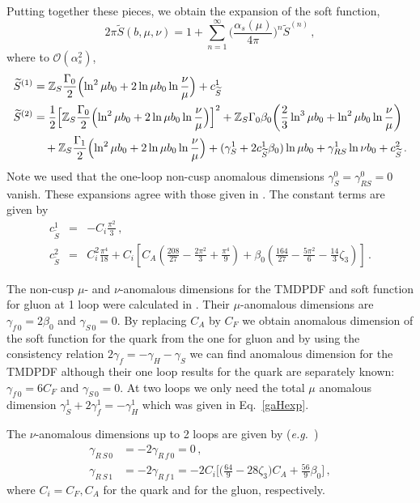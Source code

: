 \documentclass[a4,letterpaper,11pt]{article}
\newcommand{\nn}{\nonumber}
\newcommand{\be}{\begin{equation}}
\newcommand{\ee}{\end{equation}}
\newcommand{\bea}{\begin{eqnarray}}
\newcommand{\eea}{\end{eqnarray}}
\newcommand{\as}{\alpha_s}
\newcommand{\eg}{\emph{e.g.}~}
\newcommand{\cO}{\mathcal{O}}
\newcommand{\zed}{\mathbb{Z}}
\newcommand{\wt}{\widetilde}
\newcommand{\eq}[1]{Eq.~\eqref{#1}}
\begin{document}
Putting together these pieces, we obtain the expansion of the soft function,
\be
\label{Sfixedorder}
2\pi \wt S(b,\mu,\nu) = 1 + \sum_{n=1}^\infty\biggl(\frac{\as(\mu)}{4\pi}\biggr)^n \wt S^{(n)}\,,
\ee
where to $\cO(\as^2)$,
\begin{subequations}
\label{Sn}
\begin{align}
\wt S^{(1)} &= \zed_S \frac{\Gamma_0}{2} \Bigl(\ln^2 \mu b_0 + 2 \ln \mu b_0 \ln \frac{\nu}{\mu}\Bigr)  + c_{\wt S}^1 \\
\wt S^{(2)} &= \frac{1}{2}\Bigl[\zed_S \frac{\Gamma_0}{2} \Bigl(\ln^2 \mu b_0 + 2 \ln \mu b_0 \ln \frac{\nu}{\mu}\Bigr)  \Bigr]^2 + \zed_S \Gamma_0\beta_0 \biggl( \frac{2}{3}\ln^3 \mu b_0 + \ln^2 \mu b_0 \ln \frac{\nu}{\mu}\biggr)  \\
&\quad + \zed_S \frac{\Gamma_1}{2}  \Bigl(\ln^2 \mu b_0 + 2 \ln \mu b_0 \ln \frac{\nu}{\mu}\Bigr)   + (\gamma_S^1 + 2c_{\wt S}^1\beta_0) \ln\mu b_0 + \gamma_{RS}^1 \ln\nu b_0 + c_{\wt S}^2 \,. \nn
\end{align}
\end{subequations}
Note we used that the one-loop non-cusp anomalous dimensions $\gamma_S^0 = \gamma_{RS}^0 = 0$ vanish. These expansions agree with those given in \cite{Luebbert:2016itl}.
The constant terms are given by
\bea
 c_{\wt S}^1 &=& -C_i \frac{\pi^2}{3}
 \,, \nn \\
 c_{\wt S}^2 &=&C_i^2\frac{\pi^4}{18}
 + C_i \left[  C_A \left( \frac{208}{27} -\frac{2\pi^2}{3} +\frac{\pi^4}{9} \right)
 			+\beta_0 \left( \frac{164}{27} -\frac{5\pi^2}{6}-\frac{14}{3}\zeta_3 \right)    \right]
 \,.\eea


The non-cusp $\mu$- and $\nu$-anomalous dimensions for the TMDPDF and soft function for gluon at 1 loop were calculated in \cite{Chiu:2012ir}.  Their $\mu$-anomalous dimensions are $\gamma_{f\,0} = 2\beta_0$ and $\gamma_{S\,0} =0$.
By replacing $C_A$ by $C_F$ we obtain anomalous dimension of the soft function for the quark from the one for gluon and by using the consistency relation $2 \gamma_f=-\gamma_H-\gamma_S$ we can find anomalous dimension for the TMDPDF although their one loop results for the quark are separately known: $\gamma_{f\,0} = 6 C_F$ and $\gamma_{S\,0} =0$.
At two loops we only need the total $\mu$ anomalous dimension $\gamma_S^1 + 2\gamma_f^1 = -\gamma_H^1$ which was given in \eq{gaHexp}.
 

The $\nu$-anomalous dimensions up to 2 loops are given by (\eg \cite{Vladimirov:2016dll,Li:2016axz, Li:2016ctv,Luebbert:2016itl,Echevarria:2015byo})
\begin{align}\label{gaBexp}
\gamma_{R\, S\,0} & =-2 \gamma_{R\,f\,0} = 0
\,,\nn\\
 \gamma_{R\, S\,1} & =-2 \gamma_{R\,f\,1} =-2C_i \Big[  \Big(  \frac{64}{9}-28 \zeta_3   \Big) C_A +\frac{56}{9}  \beta_0 \Big] 
\,,\end{align}
where $C_i= C_F, C_A$ for the quark and for the gluon, respectively.
\end{document}
